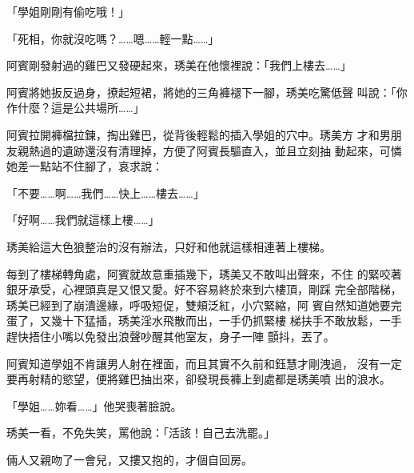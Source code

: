 「學姐剛剛有偷吃哦！」

「死相，你就沒吃嗎？……嗯……輕一點……」

阿賓剛發射過的雞巴又發硬起來，琇美在他懷裡說：「我們上樓去……」

阿賓將她扳反過身，撩起短裙，將她的三角褲褪下一腳，琇美吃驚低聲
叫說：「你作什麼？這是公共場所……」

阿賓拉開褲檔拉鍊，掏出雞巴，從背後輕鬆的插入學姐的穴中。琇美方
才和男朋友親熱過的遺跡還沒有清理掉，方便了阿賓長驅直入，並且立刻抽
動起來，可憐她差一點站不住腳了，哀求說：

「不要……啊……我們……快上……樓去……」

「好啊……我們就這樣上樓……」

琇美給這大色狼整治的沒有辦法，只好和他就這樣相連著上樓梯。

每到了樓梯轉角處，阿賓就故意重插幾下，琇美又不敢叫出聲來，不住
的緊咬著銀牙承受，心裡頭真是又恨又愛。好不容易終於來到六樓頂，剛踩
完全部階梯，琇美已經到了崩潰邊緣，呼吸短促，雙頰泛紅，小穴緊縮，阿
賓自然知道她要完蛋了，又幾十下猛插，琇美淫水飛散而出，一手仍抓緊樓
梯扶手不敢放鬆，一手趕快捂住小嘴以免發出浪聲吵醒其他室友，身子一陣
顫抖，丟了。

阿賓知道學姐不肯讓男人射在裡面，而且其實不久前和鈺慧才剛洩過，
沒有一定要再射精的慾望，便將雞巴抽出來，卻發現長褲上到處都是琇美噴
出的浪水。

「學姐……妳看……」他哭喪著臉說。

琇美一看，不免失笑，罵他說：「活該！自己去洗罷。」

倆人又親吻了一會兒，又摟又抱的，才個自回房。











